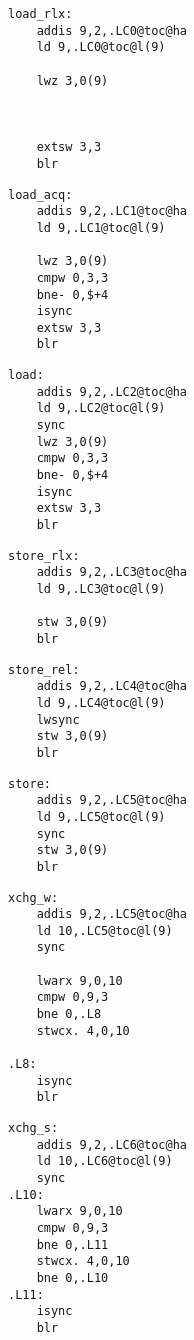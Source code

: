 \begin{multicols}{3}
    \begin{lstlisting}[style=powerpc,xleftmargin=0px,xrightmargin=0px]
load_rlx:
    addis 9,2,.LC0@toc@ha
    ld 9,.LC0@toc@l(9)

    lwz 3,0(9)



    extsw 3,3
    blr
    \end{lstlisting}
    \columnbreak
    \begin{lstlisting}[style=powerpc,xleftmargin=0px,xrightmargin=0px]
load_acq:
    addis 9,2,.LC1@toc@ha
    ld 9,.LC1@toc@l(9)

    lwz 3,0(9)
    cmpw 0,3,3
    bne- 0,$+4
    isync
    extsw 3,3
    blr
    \end{lstlisting}
    \columnbreak
    \begin{lstlisting}[style=powerpc,xleftmargin=0px,xrightmargin=0px]
load:
    addis 9,2,.LC2@toc@ha
    ld 9,.LC2@toc@l(9)
    sync
    lwz 3,0(9)
    cmpw 0,3,3
    bne- 0,$+4
    isync
    extsw 3,3
    blr
    \end{lstlisting}
\end{multicols}

\begin{multicols}{3}
    \begin{lstlisting}[style=powerpc,xleftmargin=0px,xrightmargin=0px]
store_rlx:
    addis 9,2,.LC3@toc@ha
    ld 9,.LC3@toc@l(9)

    stw 3,0(9)
    blr
    \end{lstlisting}
    \columnbreak
    \begin{lstlisting}[style=powerpc,xleftmargin=0px,xrightmargin=0px]
store_rel:
    addis 9,2,.LC4@toc@ha
    ld 9,.LC4@toc@l(9)
    lwsync
    stw 3,0(9)
    blr
    \end{lstlisting}
    \columnbreak
    \begin{lstlisting}[style=powerpc,xleftmargin=0px,xrightmargin=0px]
store:
    addis 9,2,.LC5@toc@ha
    ld 9,.LC5@toc@l(9)
    sync
    stw 3,0(9)
    blr
    \end{lstlisting}
\end{multicols}

\begin{multicols}{2}
    \begin{lstlisting}[style=powerpc]
xchg_w:
    addis 9,2,.LC5@toc@ha
    ld 10,.LC5@toc@l(9)
    sync

    lwarx 9,0,10
    cmpw 0,9,3
    bne 0,.L8
    stwcx. 4,0,10

.L8:
    isync
    blr
    \end{lstlisting}
    \columnbreak
    \begin{lstlisting}[style=powerpc]
xchg_s:
    addis 9,2,.LC6@toc@ha
    ld 10,.LC6@toc@l(9)
    sync
.L10:
    lwarx 9,0,10
    cmpw 0,9,3
    bne 0,.L11
    stwcx. 4,0,10
    bne 0,.L10
.L11:
    isync
    blr
    \end{lstlisting}
\end{multicols}
